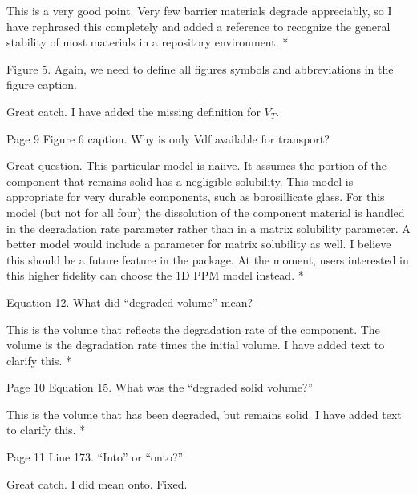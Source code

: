 \documentclass[answers,12pt]{exam}
\begin{document}
\begin{questions}
\begin{solution}
This is a very good point. Very few barrier materials degrade appreciably, so I 
have rephrased this completely and added a reference to recognize the general 
stability of most materials in a repository environment. 
        {\color{red}*}
\end{solution}

\question Figure 5. Again, we need to define all figures symbols and abbreviations in the figure caption.
\begin{solution}
Great catch. I have added the missing definition for $V_T$. 
\end{solution}

\question Page 9 Figure 6 caption. Why is only Vdf available for transport?
\begin{solution}
Great question. This particular model is naiive. It assumes the portion of the 
        component that remains solid  has a negligible solubility. This model 
        is appropriate for very durable components, such as borosillicate 
        glass.  For this model (but not for all four) the dissolution of the 
        component material is handled in the degradation rate parameter rather 
        than in a matrix solubility parameter. A better model would include a 
        parameter for matrix solubility as well. I believe this should be a 
        future feature in the package. At the moment, users interested in this 
        higher fidelity can choose the 1D PPM model instead. 
        {\color{red}*}
\end{solution}

\question Equation 12. What did ``degraded volume'' mean?
\begin{solution}
This is the volume that reflects the degradation rate of the component. The 
        volume is the degradation rate times the initial volume. I have added 
        text to clarify this.
        {\color{red}*}
\end{solution}

\question Page 10 Equation 15. What was the ``degraded solid volume?''
\begin{solution}
        This is the volume that has been degraded, but remains solid. I have 
        added text to clarify this. 
        {\color{red}*}
\end{solution}
 

\question Page 11 Line 173. ``Into'' or ``onto?''
\begin{solution}
Great catch. I did mean onto. Fixed.
\end{solution}


\end{questions}
\end{document}
